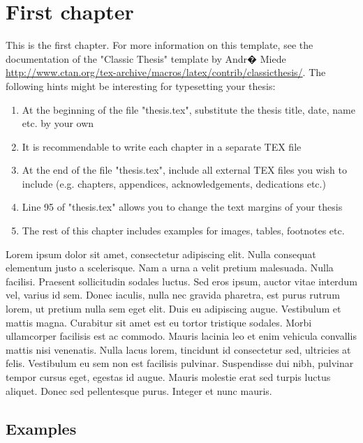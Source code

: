 \chapter{First chapter}\label{ch:first}
This is the first chapter. For more information on this template, see the documentation of the "Classic Thesis" template by Andr� Miede \url{http://www.ctan.org/tex-archive/macros/latex/contrib/classicthesis/}. The following hints might be interesting for typesetting your thesis:

\begin{enumerate}
    \item At the beginning of the file "thesis.tex", substitute the thesis title, date, name etc. by your own
    \item It is recommendable to write each chapter in a separate TEX file
    \item At the end of the file "thesis.tex", include all external TEX files you wish to include (e.g. chapters, appendices, acknowledgements, dedications etc.)
    \item Line 95 of "thesis.tex" allows you to change the text margins of your thesis
    \item The rest of this chapter includes examples for images, tables, footnotes etc.
\end{enumerate}

Lorem ipsum dolor sit amet, consectetur adipiscing elit. Nulla consequat elementum justo a scelerisque. Nam a urna a velit pretium malesuada. Nulla facilisi. Praesent sollicitudin sodales luctus. Sed eros ipsum, auctor vitae interdum vel, varius id sem. Donec iaculis, nulla nec gravida pharetra, est purus rutrum lorem, ut pretium nulla sem eget elit. Duis eu adipiscing augue. Vestibulum et mattis magna. Curabitur sit amet est eu tortor tristique sodales. Morbi ullamcorper facilisis est ac commodo. Mauris lacinia leo et enim vehicula convallis mattis nisi venenatis. Nulla lacus lorem, tincidunt id consectetur sed, ultricies at felis. Vestibulum eu sem non est facilisis pulvinar. Suspendisse dui nibh, pulvinar tempor cursus eget, egestas id augue. Mauris molestie erat sed turpis luctus aliquet. Donec sed pellentesque purus. Integer et nunc mauris.


\section{Examples}

